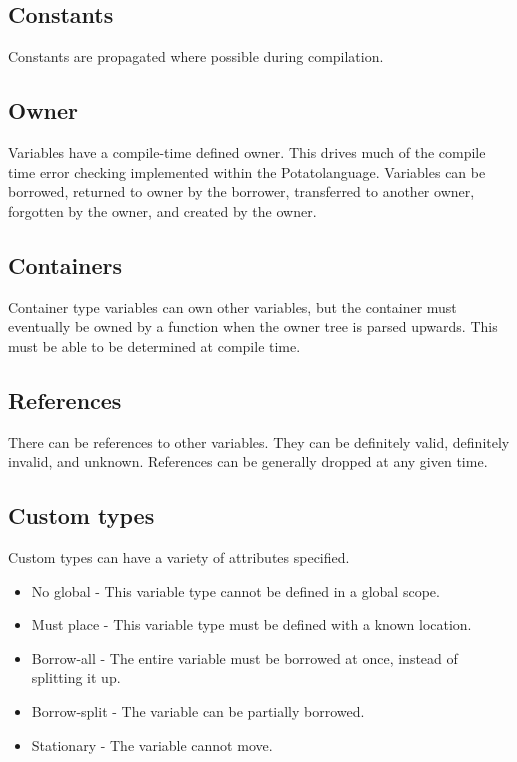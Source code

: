 \documentclass[12pt]{article}
\newcommand{\progLangNameSpace}{Potato\space }
\begin{document}
\subsection {Constants}
Constants are propagated where possible during compilation.

\subsection {Owner}

Variables have a compile-time defined owner. This drives much of the compile time error checking implemented within the \progLangNameSpace language. Variables can be borrowed, returned to owner by the borrower, transferred to another owner, forgotten by the owner, and created by the owner.

\subsection {Containers}
Container type variables can own other variables, but the container must eventually be owned by a function when the owner tree is parsed upwards. This must be able to be determined at compile time.

\subsection {References}
There can be references to other variables. They can be definitely valid, definitely invalid, and unknown. References can be generally dropped at any given time.

\subsection {Custom types}

Custom types can have a variety of attributes specified.

\begin{itemize}
\item No global - This variable type cannot be defined in a global scope.
\item Must place - This variable type must be defined with a known location.
\item Borrow-all - The entire variable must be borrowed at once, instead of splitting it up.
\item Borrow-split - The variable can be partially borrowed.
\item Stationary - The variable cannot move.
\end{itemize}
\end{document}
